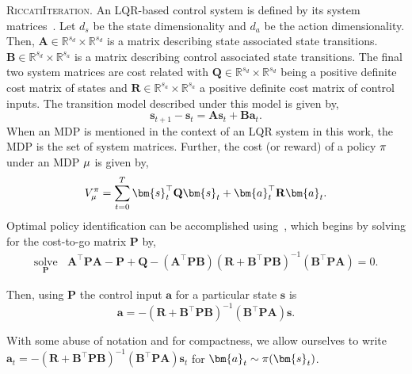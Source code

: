 \noindent\textsc{RiccatiIteration.}
An LQR-based control system is defined by its system matrices~\citep{kalman1960new}. Let $d_s$ be the state dimensionality and $d_a$ be the action dimensionality. Then, $\mathbf{A} \in \mathbb{R}^{s_d}\times\mathbb{R}^{s_d}$ is a matrix describing state associated state transitions. $\mathbf{B} \in \mathbb{R}^{s_d}\times\mathbb{R}^{s_a}$ is a matrix describing control associated state transitions. The final two system matrices are cost related with $\mathbf{Q} \in \mathbb{R}^{s_d}\times\mathbb{R}^{s_d}$ being a positive definite cost matrix of states and $\mathbf{R} \in \mathbb{R}^{s_a}\times\mathbb{R}^{s_a}$ a positive definite cost matrix of control inputs. The transition model described under this model is given by,
\begin{equation}
    \bm{s}_{t+1}-\bm{s}_t = \mathbf{A}\bm{s}_t + \mathbf{B}\bm{a}_t.
\end{equation}
When an MDP is mentioned in the context of an LQR system in this work, the MDP is the set of system matrices. Further, the cost (or reward) of a policy $\pi$ under an MDP $\mu$ is given by,
\begin{equation}
    V_{\mdp}^\pol = \sum_{t=0}^T \bm{s}_t^\top \mathbf{Q}\bm{s}_t + \bm{a}_t^\top \mathbf{R}\bm{a}_t.
\end{equation}
Optimal policy identification can be accomplished using~\citep{willems1971least}, which begins by solving for the cost-to-go matrix $\mathbf{P}$ by,
\begin{align*}
    \underset{\mathbf{P}}{\textrm{solve}}~~~~\mathbf{A}^\top \mathbf{P}\mathbf{A}-\mathbf{P}+\mathbf{Q}-(\mathbf{A}^\top \mathbf{P}\mathbf{B})(\mathbf{R}+\mathbf{B}^\top\mathbf{P}\mathbf{B})^{-1}(\mathbf{B}^\top \mathbf{P}\mathbf{A}) = 0.
\end{align*}

Then, using $\mathbf{P}$ the control input $\bm{a}$ for a particular state $\bm{s}$ is
\begin{equation}
    \bm{a} = -(\mathbf{R}+\mathbf{B}^\top\mathbf{P}\mathbf{B})^{-1}(\mathbf{B}^\top\mathbf{P}\mathbf{A})\bm{s}.
\end{equation}

With some abuse of notation and for compactness, we allow ourselves to write $\bm{a}_t = -(\mathbf{R}+\mathbf{B}^\top\mathbf{P}\mathbf{B})^{-1}(\mathbf{B}^\top\mathbf{P}\mathbf{A})\bm{s}_t$ for $\bm{a}_t \sim \pol(\bm{s}_t)$.
